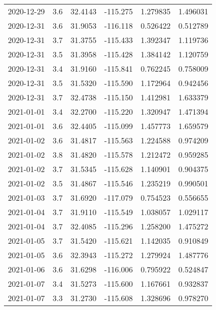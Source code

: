 \begin{tabular}{lrrrrr}
2020-12-29 &       3.6 &  32.4143 &  -115.275 &         1.279835 &         1.496031 \\
2020-12-31 &       3.6 &  31.9053 &  -116.118 &         0.526422 &         0.512789 \\
2020-12-31 &       3.7 &  31.3755 &  -115.433 &         1.392347 &         1.119736 \\
2020-12-31 &       3.5 &  31.3958 &  -115.428 &         1.384142 &         1.120759 \\
2020-12-31 &       3.4 &  31.9160 &  -115.841 &         0.762245 &         0.758009 \\
2020-12-31 &       3.5 &  31.5320 &  -115.590 &         1.172964 &         0.942456 \\
2020-12-31 &       3.7 &  32.4738 &  -115.150 &         1.412981 &         1.633379 \\
2021-01-01 &       3.4 &  32.2700 &  -115.220 &         1.320947 &         1.471394 \\
2021-01-01 &       3.6 &  32.4405 &  -115.099 &         1.457773 &         1.659579 \\
2021-01-02 &       3.6 &  31.4817 &  -115.563 &         1.224588 &         0.974209 \\
2021-01-02 &       3.8 &  31.4820 &  -115.578 &         1.212472 &         0.959285 \\
2021-01-02 &       3.7 &  31.5345 &  -115.628 &         1.140901 &         0.904375 \\
2021-01-02 &       3.5 &  31.4867 &  -115.546 &         1.235219 &         0.990501 \\
2021-01-03 &       3.7 &  31.6920 &  -117.079 &         0.754523 &         0.556655 \\
2021-01-04 &       3.7 &  31.9110 &  -115.549 &         1.038057 &         1.029117 \\
2021-01-04 &       3.7 &  32.4085 &  -115.296 &         1.258200 &         1.475272 \\
2021-01-05 &       3.7 &  31.5420 &  -115.621 &         1.142035 &         0.910849 \\
2021-01-05 &       3.6 &  32.3943 &  -115.272 &         1.279924 &         1.487776 \\
2021-01-06 &       3.6 &  31.6298 &  -116.006 &         0.795922 &         0.524847 \\
2021-01-07 &       3.4 &  31.5273 &  -115.600 &         1.167661 &         0.932837 \\
2021-01-07 &       3.3 &  31.2730 &  -115.608 &         1.328696 &         0.978270 \\

\end{tabular}
